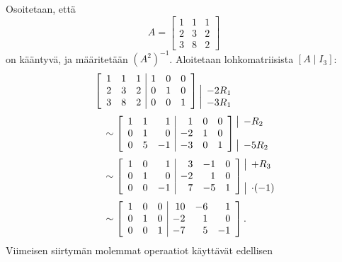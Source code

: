 \documentclass[11pt,a4paper]{amsart}
\begin{document}
  \begin{example}
    Osoitetaan, että
    \[
      A=
      \begin{bmatrix}1&1&1\\2&3&2\\3&8&2
      \end{bmatrix}
    \]
    on kääntyvä, ja määritetään $(A^2)^{-1}$.
    Aloitetaan lohkomatriisista $[A\mid I_3]$:
    \begin{align*}
      &\left[
        \begin{array}{rrr|rrr}
          1&1&1&1&0&0\\2&3&2&0&1&0\\3&8&2&0&0&1
      \end{array}\right]
      \begin{array}{@{}l@{}}\vphantom{0}\\\rowop{-2R_1}\\\rowop{-3R_1}
      \end{array}\\[3pt]
      &\quad\sim
      \left[
        \begin{array}{rrr|rrr}
          1&1&1&1&0&0\\0&1&0&-2&1&0\\0&5&-1&-3&0&1
      \end{array}\right]
      \begin{array}{@{}l@{}}\rowop{-R_2}\\\vphantom{0}\\\rowop{-5R_2}
      \end{array}\\[3pt]
      &\quad\sim
      \left[
        \begin{array}{rrr|rrr}
          1&0&1&3&-1&0\\0&1&0&-2&1&0\\0&0&-1&7&-5&1
      \end{array}\right]
      \begin{array}{@{}l@{}}\rowop{+R_3}\\\vphantom{0}\\\rowop{\cdot(-1)}
      \end{array}\\[3pt]
      &\quad\sim
      \left[
        \begin{array}{rrr|rrr}
          1&0&0&10&-6&1\\0&1&0&-2&1&0\\0&0&1&-7&5&-1
      \end{array}\right].
    \end{align*}
    Viimeisen siirtymän molemmat operaatiot käyttävät edellisen

\end{example}
\end{document}
